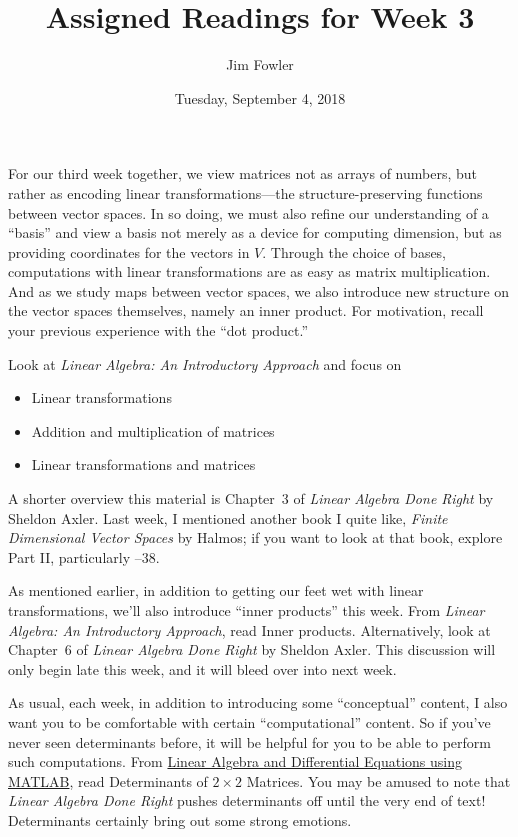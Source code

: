 \documentclass{homework}
\author{Jim Fowler}
\title{Assigned Readings for Week 3}
\date{Tuesday, September 4, 2018}
\begin{document}
\maketitle

For our third week together, we view matrices not as arrays of
numbers, but rather as encoding linear transformations---the
structure-preserving functions between vector spaces.  In so doing, we
must also refine our understanding of a ``basis'' and view a basis not
merely as a device for computing dimension, but as providing
coordinates for the vectors in $V$.  Through the choice of bases,
computations with linear transformations are as easy as matrix
multiplication.  And as we study maps between vector spaces, we also
introduce new structure on the vector spaces themselves, namely an
inner product.  For motivation, recall your previous experience with
the ``dot product.''

Look at \textit{Linear Algebra: An Introductory Approach} and focus on
\begin{itemize}
\item {} Linear transformations
\item {} Addition and multiplication of matrices
\item {} Linear transformations and matrices
\end{itemize}
A shorter overview this material is Chapter~3 of \textit{Linear
  Algebra Done Right} by Sheldon Axler.  Last week, I mentioned
another book I quite like, \textit{Finite Dimensional Vector Spaces}
by Halmos; if you want to look at that book, explore Part II,
particularly --38.

As mentioned earlier, in addition to getting our feet wet with linear
transformations, we'll also introduce ``inner products'' this week.
From \textit{Linear Algebra: An Introductory Approach}, read
 Inner products.  Alternatively, look at Chapter~6 of
\textit{Linear Algebra Done Right} by Sheldon Axler.  This discussion
will only begin late this week, and it will bleed over into next week.

As usual, each week, in addition to introducing some ``conceptual''
content, I also want you to be comfortable with certain
``computational'' content.  So if you've never seen determinants
before, it will be helpful for you to be able to perform such
computations.  From
\href{/courses/43735/files/folder/textbooks}{Linear Algebra and
  Differential Equations using MATLAB}, read 
Determinants of $2\times 2$ Matrices.  You may be amused to note that
\textit{Linear Algebra Done Right} pushes determinants off until the
very end of text!  Determinants certainly bring out some strong
emotions.
\end{document}
